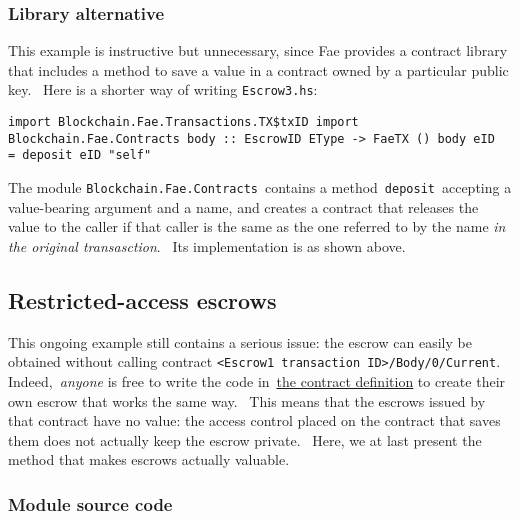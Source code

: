 \documentclass[11pt]{article}
\newcommand{\codeblock}[1]{\begin{mdframed}[
    backgroundcolor=header-color,
    linecolor=header-color,
    innertopmargin=10pt,
    ]{\texttt{#1}}\end{mdframed}}
\DeclareRobustCommand{\fuline}[1]{\texorpdfstring{\uline{#1}}{#1}}
\begin{document}
\subsubsection{Library alternative}
\vspace{5.5pt}

This example is instructive but unnecessary, since Fae provides a contract library that includes a method to save a value in a contract owned by a particular public key.  Here is a shorter way of writing \texttt{Escrow3.hs}:

\codeblock{import Blockchain.Fae.Transactions.TX\$txID\newline
import Blockchain.Fae.Contracts\newline
\newline
body :: EscrowID EType -\textgreater{} FaeTX ()\newline
body eID = deposit eID "self"}

The module \texttt{Blockchain.Fae.Contracts} contains a method \texttt{deposit} accepting a value-bearing argument and a name, and creates a contract that releases the value to the caller if that caller is the same as the one referred to by the name \textit{in the original transasction}.  Its implementation is as shown above.

\subsection{Restricted-access escrows}
\vspace{5.5pt}

This ongoing example still contains a serious issue: the escrow can easily be obtained without calling contract \texttt{\textless{}}\texttt{Escrow1 transaction ID}\texttt{\textgreater{}}\texttt{\slash{}Body\slash{}0\slash{}Current}.  Indeed, \textit{anyone} is free to write the code in \href{https://consensys.quip.com/2wGTAw6Fgm87/Tutorial-2-Escrows\%23ZRIACABrgQl}{\fuline{the contract definition}} to create their own escrow that works the same way.  This means that the escrows issued by that contract have no value: the access control placed on the contract that saves them does not actually keep the escrow private.  Here, we at last present the method that makes escrows actually valuable.

\subsubsection{Module source code}
\vspace{5.5pt}
\end{document}
